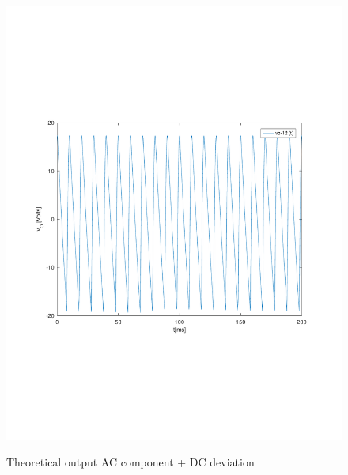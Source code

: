 \begin{figure}[!ht] \centering
\caption{Theoretical output AC component + DC deviation}
\squeezeup 
\squeezeup 
\squeezeup 
\squeezeup 
\squeezeup 
\squeezeup 
\squeezeup 
\squeezeup 
\includegraphics[width=0.8\linewidth]{deviation.pdf}
\label{fig:theo2}
\end{figure}

